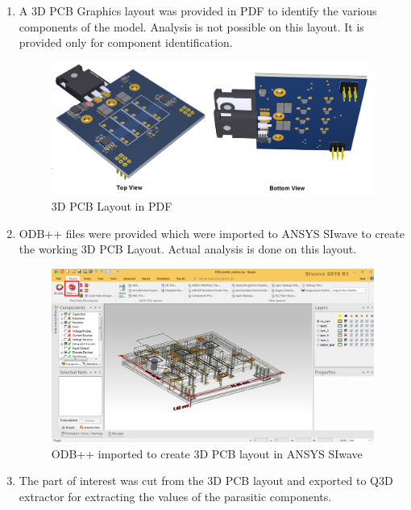 \begin{enumerate}
\item A 3D PCB Graphics layout was provided in PDF to identify the various components of the model. Analysis is not possible on this layout. It is provided only for component identification.

\begin{figure} [H]
  \centering
  \includegraphics[width=\linewidth]{pictures/examples/PCB.png}
  \caption{3D PCB Layout in PDF}
  \label{fig:pcb}
\end{figure}

\item ODB++ files were provided which were imported to ANSYS SIwave to create the working 3D PCB Layout. Actual analysis is done on this layout.

\begin{figure} [H]
  \centering
  \includegraphics[width=\linewidth]{pictures/examples/siwave.png}
  \caption{ODB++ imported to create 3D PCB layout in ANSYS SIwave}
  \label{fig:siwave}
\end{figure}

\item The part of interest was cut from the 3D PCB layout and exported to Q3D extractor for extracting the values of the parasitic components.


\end{enumerate}
